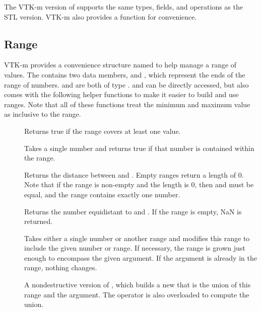 The VTK-m version of  supports the same types, fields, and
operations as the STL version. VTK-m also provides a 
function for convenience.

\subsection{Range}
\label{sec:Range}

VTK-m provides a convenience structure named  to help manage a
range of values. The   contains two
data members,  and , which represent the ends
of the range of numbers.  and  are both of type
.  and  can be directly accessed,
but  also comes with the following helper functions
to make it easier to build and use ranges. Note that all of these functions
treat the minimum and maximum value as inclusive to the range.

\begin{description}
\item[] Returns true if the range covers at least one
  value.
\item[] Takes a single number and returns true if that
  number is contained within the range.
\item[] Returns the distance between  and
  . Empty ranges return a length of 0. Note that if the range
  is non-empty and the length is 0, then  and  must
  be equal, and the range contains exactly one number.
\item[] Returns the number equidistant to 
  and . If the range is empty, NaN is returned.
\item[] Takes either a single number or another range and
  modifies this range to include the given number or range. If necessary,
  the range is grown just enough to encompass the given argument. If the
  argument is already in the range, nothing changes.
\item[] A nondestructive version of ,
  which builds a new  that is the union of this range
  and the argument. The \textcode{+} operator is also overloaded to compute
  the union.
\end{description}

